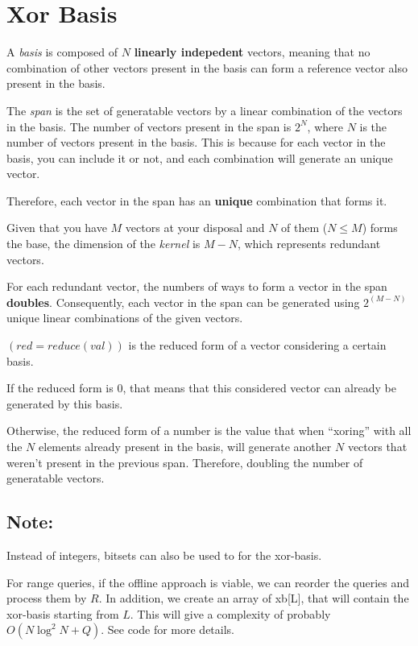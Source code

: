 \section{Xor Basis}

A \textit{basis} is composed of $N$ \textbf{linearly indepedent} vectors, 
meaning that no combination of other vectors present in the basis can form a reference vector also present in the basis.

The \textit{span} is the set of generatable vectors by a linear combination of the vectors in the basis.
The number of vectors present in the span is $2^N$, where $N$ is the number of vectors present in the basis.
This is because for each vector in the basis, you can include it or not, and each combination will generate an unique vector.

Therefore, each vector in the span has an \textbf{unique} combination that forms it. 

Given that you have $M$ vectors at your disposal and $N$ of them ($N \leq M$) forms the base,
the dimension of the \textit{kernel} is $M-N$, which represents redundant vectors.

For each redundant vector, the numbers of ways to form a vector in the span \textbf{doubles}.
Consequently, each vector in the span 
can be generated using $2^(M-N)$ unique linear combinations of the given vectors. 

$(red = reduce(val))$ is the reduced form of a vector considering a certain basis.

If the reduced form is $0$, that means that this considered vector can already be generated by this basis.

Otherwise, the reduced form of a number is the value that when ``xoring'' with all the $N$ elements 
already present in the basis, will generate another $N$ vectors that weren't present in the previous span.
Therefore, doubling the number of generatable vectors.

\subsection{Note:}

Instead of integers, bitsets can also be used to for the xor-basis.

For range queries, if the offline approach is viable, we can reorder the queries and process them by $R$. 
In addition, we create an array of xb[L], that will contain the xor-basis starting from $L$. 
This will give a complexity of probably $O(N \log^2{N} + Q)$. See code for more details.

